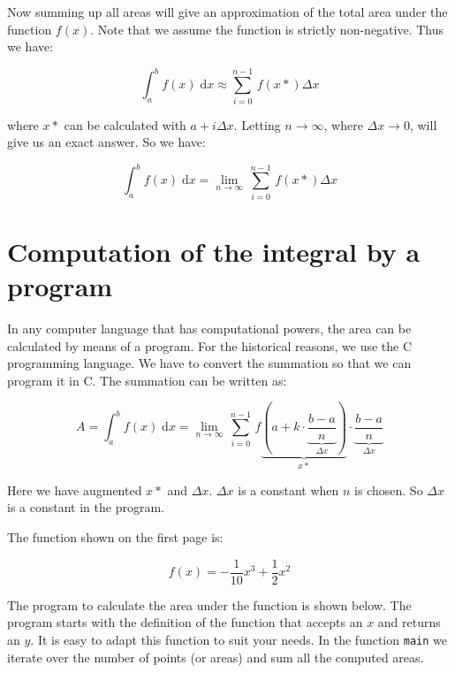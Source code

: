\documentclass[12pt]{article}
\begin{document}
Now summing up all areas will give an approximation of the total area under the function $f(x)$. Note that we assume the function is strictly non-negative. Thus we have:

\begin{equation}
\int_a^b f(x)\; \mathrm{d}x \approx \sum_{i=0}^{n-1}\, f(x*)\Delta x
\end{equation}

where $x*$ can be calculated with $a+i\Delta x$. Letting $n\rightarrow\infty$, where $\Delta x\rightarrow 0$, will give us an exact answer. So we have:

\begin{equation}
\int_a^b f(x)\; \mathrm{d}x = \lim_{n\rightarrow\infty}\, \sum_{i=0}^{n-1}\, f(x*)\Delta x
\end{equation}

\section{Computation of the integral by a program}
In any computer language that has computational powers, the area can be calculated by means of a program. For the historical reasons, we use the C programming language. We have to convert the summation so that we can program it in C. The summation can be written as:

\begin{equation}
A = \int_{a}^{b}f(x)\;\mathrm{d}x = \lim\limits_{n\to\infty}\,\sum_{i=0}^{n-1}\,f\underbrace{\left(a+k\cdot\underbrace{\frac{b-a}{n}}_{\Delta x}\right)}_{x*}\cdot\underbrace{\frac{b-a}{n}}_{\Delta x}
\end{equation}

Here we have augmented $x*$ and $\Delta x$. $\Delta x$ is a constant when $n$ is chosen. So $\Delta x$ is a constant in the program.

The function shown on the first page is:

\begin{equation}
f(x) = -\frac{1}{10}x^3 + \frac{1}{2}x^2
\end{equation}

The program to calculate the area under the function is shown below. The program starts with the definition of the function that accepts an $x$ and returns an $y$. It is easy to adapt this function to suit your needs. In the function \lstinline|main| we iterate over the number of points (or areas) and sum all the computed areas.
\end{document}
